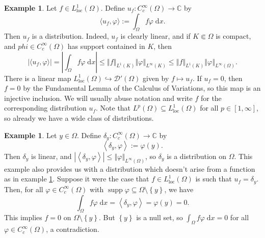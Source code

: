 \documentclass{book}
\newcommand{\scrD}{\mathscr{D}}
\newcommand{\bbC}{\mathbb{C}}
\renewcommand{\d}{\mathrm{d}}
\renewcommand{\phi}{\varphi}
\newcommand{\abs}[1]{\left\lvert {#1} \right\rvert}
\newcommand{\norm}[1]{\left\Vert {#1} \right\Vert}
\newcommand{\set}[1]{\left\{ {#1} \right\}}
\newcommand{\angles}[1]{\left\langle {#1} \right\rangle}
\DeclareMathOperator{\supp}{supp}
\theoremstyle{definition}
\newtheorem{example}[theorem]{Example}
\theoremstyle{remark}
\numberwithin{equation}{chapter}
\begin{document}
\begin{example} \label{eg:locallyIntegrableFunctionsAreDistributions}
    Let $f \in L_{\text{loc}}^1(\Omega)$. Define $u_f \colon C_c^\infty(\Omega) \to \bbC$ by 
    \begin{equation}
        \langle u_f, \phi \rangle := \int_\Omega f\phi \; \d x.
    \end{equation}
    Then $u_f$ is a distribution. Indeed, $u_f$ is clearly linear, and if $K \Subset \Omega$ is compact, and $phi \in C_c^\infty(\Omega)$ has support contained in $K$, then
    \begin{equation}
        \abs{\langle u_f, \phi \rangle} =    \abs{\int_\Omega f\phi \; \d x} 
                                        \leq \norm{f}_{L^1(K)} \norm{\phi}_{L^\infty(K)} 
                                        \leq \norm{f}_{L^1(K)} \norm{\phi}_{L^\infty(\Omega)}.
    \end{equation}
    There is a linear map $L_\text{loc}^1(\Omega) \hookrightarrow \scrD'(\Omega)$ given by $f \mapsto u_f$. If $u_f = 0$, then $f = 0$ by the Fundamental Lemma of the Calculus of Variations, so this map is an injective inclusion. We will usually abuse notation and write $f$ for the corresponding distribution $u_f$. Note that $L^p(\Omega) \subseteq L_\text{loc}^1(\Omega)$ for all $p \in [1,\infty]$, so already we have a wide class of distributions.
\end{example}
\begin{example} \label{eg:deltaDistribution}
    Let $y \in \Omega$. Define $\delta_y \colon C_c^\infty(\Omega) \to \bbC$ by 
    \begin{equation}
        \angles{\delta_y,\phi} := \phi(y).
    \end{equation}
    Then $\delta_y$ is linear, and $\abs{\angles{\delta_y,\phi}} \leq \norm{\phi}_{L^\infty(\Omega)}$, so $\delta_y$ is a distribution on $\Omega$. This example also provides us with a distribution which doesn't arise from a function as in example \ref{eg:locallyIntegrableFunctionsAreDistributions}. Suppose it were the case that $f \in L_\text{loc}^1(\Omega)$ is such that $u_f = \delta_y$. Then, for all $\phi \in C_c^\infty(\Omega)$ with $\supp{\phi} \subseteq \Omega \setminus \set{y}$, we have
    \begin{equation}
        \int_\Omega f\phi \; \d x = \angles{\delta_y,\phi} = \phi(y) = 0.
    \end{equation}
    This implies $f = 0$ on $\Omega \setminus \set{y}$. But $\set{y}$ is a null set, so $\int_\Omega f\phi \; \d x = 0$ for all $\phi \in C_c^\infty(\Omega)$, a contradiction.
\end{example}
\end{document}
